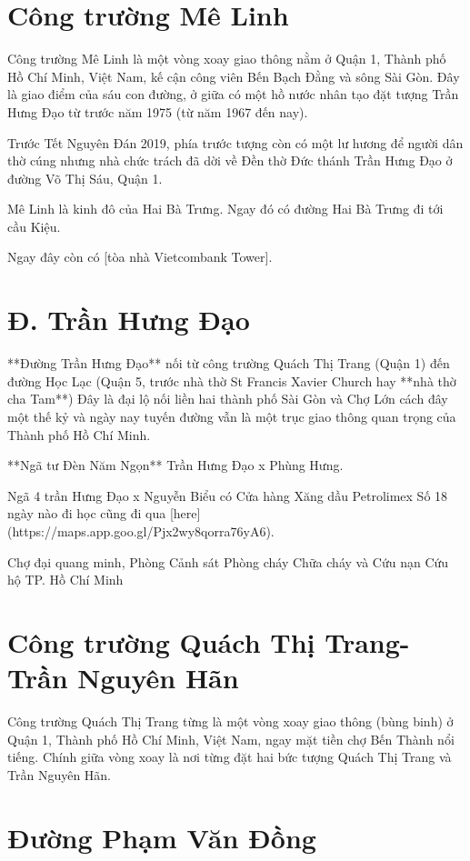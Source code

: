 \section{Công trường Mê Linh}

Công trường Mê Linh là một vòng xoay giao thông nằm ở Quận 1, Thành phố Hồ Chí Minh, Việt Nam, kế cận công viên Bến Bạch Đằng và sông Sài Gòn. Đây là giao điểm của sáu con đường, ở giữa có một hồ nước nhân tạo đặt tượng Trần Hưng Đạo từ trước năm 1975 (từ năm 1967 đến nay).

Trước Tết Nguyên Đán 2019, phía trước tượng còn có một lư hương để người dân thờ cúng nhưng nhà chức trách đã dời về Đền thờ Đức thánh Trần Hưng Đạo ở đường Võ Thị Sáu, Quận 1.

Mê Linh là kinh đô của Hai Bà Trưng. Ngay đó có đường Hai Bà Trưng đi tới cầu Kiệu.

Ngay đây còn có [tòa nhà Vietcombank Tower].

\section{Đ. Trần Hưng Đạo}

**Đường Trần Hưng Đạo** nối từ công trường Quách Thị Trang (Quận 1) đến đường Học Lạc (Quận 5, trước nhà thờ St Francis Xavier Church hay **nhà thờ cha Tam**) Đây là đại lộ nối liền hai thành phố Sài Gòn và Chợ Lớn cách đây một thế kỷ và ngày nay tuyến đường vẫn là một trục giao thông quan trọng của Thành phố Hồ Chí Minh.

**Ngã tư Đèn Năm Ngọn** Trần Hưng Đạo x Phùng Hưng.

Ngã 4 trần Hưng Đạo x Nguyễn Biểu có Cửa hàng Xăng dầu Petrolimex Số 18 ngày nào đi học cũng đi qua [here](https://maps.app.goo.gl/Pjx2wy8qorra76yA6).

Chợ đại quang minh, Phòng Cảnh sát Phòng cháy Chữa cháy và Cứu nạn Cứu hộ TP. Hồ Chí Minh

\section{Công trường Quách Thị Trang-Trần Nguyên Hãn}

Công trường Quách Thị Trang từng là một vòng xoay giao thông (bùng binh) ở Quận 1, Thành phố Hồ Chí Minh, Việt Nam, ngay mặt tiền chợ Bến Thành nổi tiếng. Chính giữa vòng xoay là nơi từng đặt hai bức tượng Quách Thị Trang và Trần Nguyên Hãn.

\section{Đường Phạm Văn Đồng}

